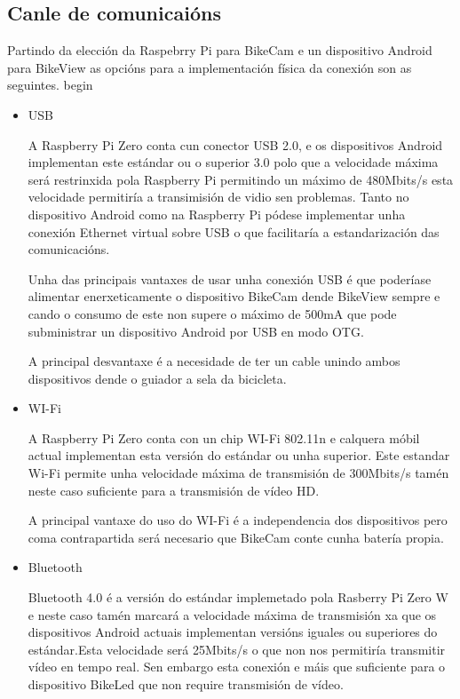 \subsection{Canle de comunicaións}
Partindo da elección da Raspebrry Pi para BikeCam e un dispositivo Android para BikeView as opcións para a implementación física da conexión son as seguintes.
begin{\begin{itemize}
  \item USB

  A Raspberry Pi Zero conta cun conector USB 2.0, e os dispositivos Android implementan este estándar ou o superior 3.0 polo que a velocidade máxima será restrinxida pola Raspberry Pi permitindo un máximo de 480Mbits/s esta velocidade permitiría a transimisión de vidio sen problemas.
  Tanto no dispositivo Android como na Raspberry Pi pódese implementar unha conexión Ethernet virtual sobre USB o que facilitaría a estandarización das comunicacións.

  Unha das principais vantaxes de usar unha conexión USB é que poderíase alimentar enerxeticamente o dispositivo BikeCam dende BikeView sempre e cando o consumo de este non supere o máximo de 500mA que pode subministrar un dispositivo Android por USB en modo OTG.

  A principal desvantaxe é a necesidade de ter un cable unindo ambos dispositivos dende o guiador a sela da bicicleta.

  \item WI-Fi

  A Raspberry Pi Zero conta con un chip WI-Fi 802.11n e calquera móbil actual implementan esta versión do estándar ou unha superior. Este estandar Wi-Fi permite unha velocidade máxima de transmisión de 300Mbits/s tamén neste caso suficiente para a transmisión de vídeo HD.

  A principal vantaxe do uso do WI-Fi é a independencia dos dispositivos pero coma contrapartida será necesario que BikeCam conte cunha batería propia.

  \item Bluetooth

  Bluetooth 4.0 é a versión do estándar implemetado pola Rasberry Pi Zero W e neste caso tamén marcará a velocidade máxima de transmisión xa que os dispositivos Android actuais implementan versións iguales ou superiores do estándar.Esta velocidade será 25Mbits/s o que non nos permitiría transmitir vídeo en tempo real. Sen embargo esta conexión e máis que suficiente para o dispositivo BikeLed que non require transmisión de vídeo.


\end{itemize}}
